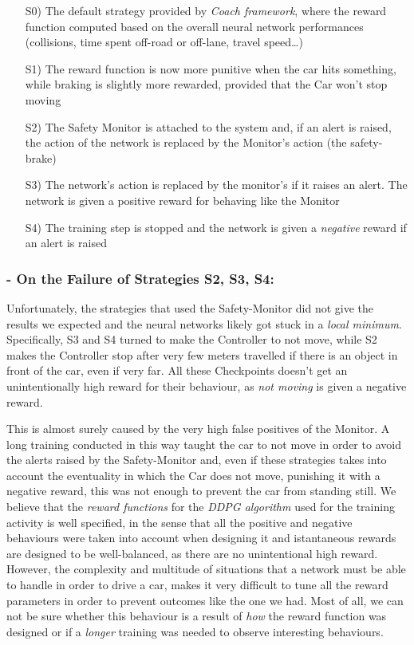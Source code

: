 \begin{itemize}
	\item[S0)] The default strategy provided by \textsl{Coach framework}, where the reward function computed based on the overall neural network performances (collisions, time spent off-road or off-lane, travel speed\dots)
	\item[S1)] The reward function is now more punitive when the car hits something, while braking is slightly more rewarded, provided that the Car won't stop moving
	\item[S2)] The Safety Monitor is attached to the system and, if an alert is raised, the action of the network is replaced by the Monitor's action (the safety-brake)
	\item[S3)] The network's action is replaced by the monitor's if it raises an alert. The network is given a positive reward for behaving like the Monitor
	\item[S4)] The training step is stopped and the network is given a \textsl{negative} reward if an alert is raised
\end{itemize}

\subsubsection{- On the Failure of Strategies S2, S3, S4:}

Unfortunately, the strategies that used the Safety-Monitor did not give the results we expected and the neural networks likely got stuck in a \textsl{local minimum}. Specifically, S3 and S4 turned to make the Controller to not move, while S2 makes the Controller stop after very few meters travelled if there is an object in front of the car, even if very far. All these Checkpoints doesn't get an unintentionally high reward for their behaviour, as \textsl{not moving} is given a negative reward.

This is almost surely caused by the very high false positives of the Monitor. A long training conducted in this way taught the car to not move in order to avoid the alerts raised by the Safety-Monitor and, even if these strategies takes into account the eventuality in which the Car does not move, punishing it with a negative reward, this was not enough to prevent the car from standing still.
We believe that the \textsl{reward functions} for the \textsl{DDPG algorithm} used for the training activity is well specified, in the sense that all the positive and negative behaviours were taken into account when designing it and istantaneous rewards are designed to be well-balanced, as there are no unintentional high reward. However, the complexity and multitude of situations that a network must be able to handle in order to drive a car, makes it very difficult to tune all the reward parameters in order to prevent outcomes like the one we had. Most of all, we can not be sure whether this behaviour is a result of \textsl{how} the reward function was designed or if a \textsl{longer} training was needed to observe interesting behaviours.

